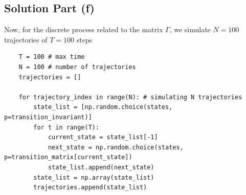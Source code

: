 \subsection*{Solution Part (f)}

Now, for the discrete process related to the matrix $\Gamma$, we simulate $N = 100$ trajectories of $T = 100$ steps

\begin{verbatim}
    T = 100 # max time
    N = 100 # number of trajectories
    trajectories = []
    
    for trajectory_index in range(N): # simulating N trajectories
        state_list = [np.random.choice(states, p=transition_invariant)]
        for t in range(T):
            current_state = state_list[-1]
            next_state = np.random.choice(states, p=transition_matrix[current_state])
            state_list.append(next_state)
        state_list = np.array(state_list)
        trajectories.append(state_list)
\end{verbatim}


